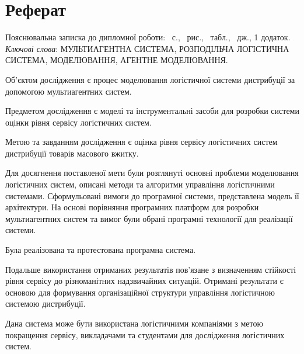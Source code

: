 \section*{Реферат}
Пояснювальна записка до дипломної роботи: \pageref{LastPage}~с., \totalfigures~рис., \totaltables~табл., ~дж., 1 додаток. \bigbreak
\textit{Ключові слова}: \MakeUppercase{мультиагентна система, розподільча логістична система, моделювання, агентне моделювання}. \bigbreak

Об’єктом дослідження є процес моделювання логістичної системи дистрибуції за допомогою мультиагентних систем.

Предметом дослідження є моделі та інструментальні засоби для розробки системи оцінки рівня сервісу логістичних систем.

Метою та завданням дослідження є оцінка рівня сервісу логістичних систем дистрибуції товарів масового вжитку.

Для досягнення поставленої мети були розглянуті основні проблеми моделювання логістичних систем, описані методи та алгоритми управління логістичними системами. Сформульовані вимоги до програмної системи, представлена модель її архітектури. На основі порівняння програмних платформ для розробки мультиагентних систем та вимог були обрані програмні технології для реалізації системи.

Була реалізована та протестована програмна система. 

Подальше використання отриманих результатів пов'язане з визначенням стійкості рівня сервісу до різноманітних надзвичайних ситуацій. Отримані результати є основою для формування організаційної структури управління логістичною системою дистрибуції.

Дана система може бути використана логістичними компаніями з метою покращення сервісу, викладачами та студентами для дослідження логістичних систем. 
